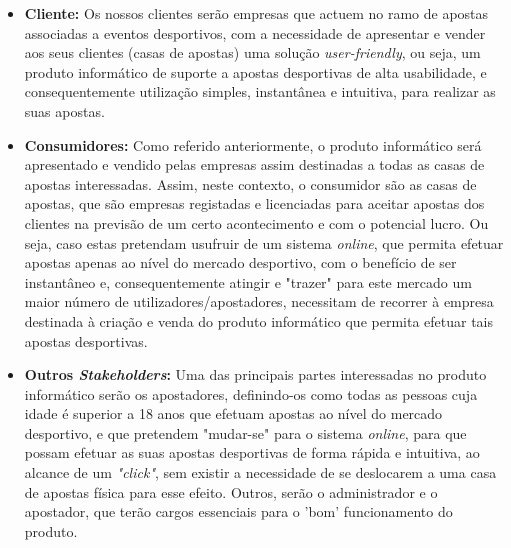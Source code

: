 \begin{itemize}
\item \textbf{Cliente:} Os nossos clientes serão empresas que actuem no ramo de apostas associadas a eventos desportivos, com a necessidade de apresentar e vender aos seus clientes (casas de apostas) uma solução \textit{user-friendly}, ou seja, um produto informático de suporte a apostas desportivas de alta usabilidade, e consequentemente utilização simples, instantânea e intuitiva, para realizar as suas apostas.

\item \textbf{Consumidores:} Como referido anteriormente, o produto informático será apresentado e vendido pelas empresas assim destinadas a todas as casas de apostas interessadas. Assim, neste contexto, o consumidor são as casas de apostas, que são empresas registadas e licenciadas para aceitar apostas dos clientes na previsão de um certo acontecimento e com o potencial lucro. Ou seja, caso estas pretendam usufruir de um sistema \textit{online}, que permita efetuar apostas apenas ao nível do mercado desportivo, com o benefício de ser instantâneo e, consequentemente atingir e "trazer" para este mercado um maior número de utilizadores/apostadores, necessitam de recorrer à empresa destinada à criação e venda do produto informático que permita efetuar tais apostas desportivas.

\item \textbf{Outros \textit{Stakeholders}:} Uma das principais partes interessadas no produto informático serão os apostadores, definindo-os como todas as pessoas cuja idade é superior a 18 anos que efetuam apostas ao nível do mercado desportivo, e que pretendem "mudar-se" para o sistema \textit{online}, para que possam efetuar as suas apostas desportivas de forma rápida e intuitiva, ao alcance de um \textit{"click"}, sem existir a necessidade de se deslocarem a uma casa de apostas física para esse efeito. Outros, serão o administrador e o apostador, que terão cargos essenciais para o 'bom' funcionamento do produto.

\end{itemize}

